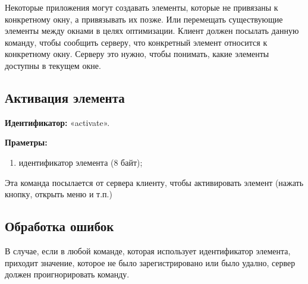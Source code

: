 Некоторые приложения могут создавать элементы, которые не привязаны к
конкретному окну, а привязывать их позже. Или перемещать существующие элементы
между окнами в целях оптимизации. Клиент должен посылать данную команду, чтобы
сообщить серверу, что конкретный элемент относится к конкретному окну. Серверу
это нужно, чтобы понимать, какие элементы доступны в текущем окне.

\subsection{Активация элемента}

\textbf{Идентификатор:} «activate».

\textbf{Праметры:}
\begin{enumerate}
\item идентификатор элемента (8 байт);
\end{enumerate}

Эта команда посылается от сервера клиенту, чтобы активировать элемент (нажать
кнопку, открыть меню и т.п.)

\subsection{Обработка ошибок}

В случае, если в любой команде, которая использует идентификатор элемента,
приходит значение, которое не было зарегистрировано или было удално, сервер
должен проигнорировать команду.
